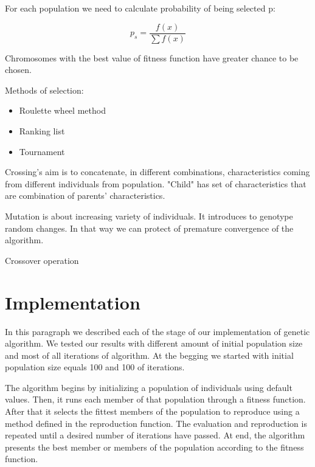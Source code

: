 \documentclass[a4paper, 12pt]{article}
\begin{document}
For each population we need to calculate probability of being selected p:

	\[  p_s = \dfrac{f(x)}{\sum{f(x)}}\]
		

Chromosomes with the best value of fitness function have greater chance to be chosen.

Methods of selection:

\begin{itemize}
	\item Roulette wheel method 
	\item Ranking list
	\item Tournament 

\end{itemize}


Crossing's aim is to concatenate, in different combinations, characteristics coming from different individuals from population. "Child" has set of characteristics that are combination of parents' characteristics.

Mutation is about increasing variety of individuals. It introduces to genotype random changes. In that way we can protect of premature convergence of the algorithm.



Crossover operation


\section{Implementation}

In this paragraph we described each of the stage of our implementation of genetic algorithm. 
We tested our results with different amount of initial population size and most of all iterations of algorithm.
At the begging we started with initial population size equals 100 and 100 of iterations.

The algorithm begins by initializing a population of individuals using default values. Then, it runs each member of that population through a fitness function. After that it selects the fittest members of the population to reproduce using a method defined in the reproduction function. The evaluation and reproduction is repeated until a desired number of iterations have passed. At end, the algorithm presents the best member or members of the population according to the fitness function.
\end{document}

